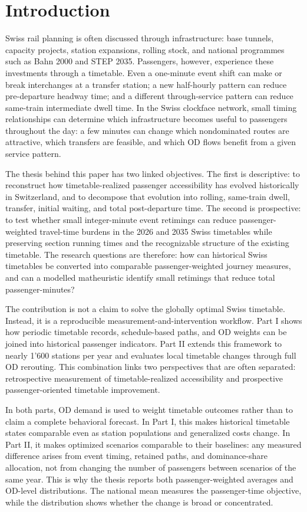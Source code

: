 \documentclass[conference]{IEEEtran}
\begin{document}
\section{Introduction}
Swiss rail planning is often discussed through infrastructure: base tunnels, capacity projects, station expansions, rolling stock, and national programmes such as Bahn 2000 and STEP 2035. Passengers, however, experience these investments through a timetable. Even a one-minute event shift can make or break interchanges at a transfer station; a new half-hourly pattern can reduce pre-departure headway time; and a different through-service pattern can reduce same-train intermediate dwell time. In the Swiss clockface network, small timing relationships can determine which infrastructure becomes useful to passengers throughout the day: a few minutes can change which nondominated routes are attractive, which transfers are feasible, and which OD flows benefit from a given service pattern.

The thesis behind this paper has two linked objectives. The first is descriptive: to reconstruct how timetable-realized passenger accessibility has evolved historically in Switzerland, and to decompose that evolution into rolling, same-train dwell, transfer, initial waiting, and total post-departure time. The second is prospective: to test whether small integer-minute event retimings can reduce passenger-weighted travel-time burdens in the 2026 and 2035 Swiss timetables while preserving section running times and the recognizable structure of the existing timetable. The research questions are therefore: how can historical Swiss timetables be converted into comparable passenger-weighted journey measures, and can a modelled matheuristic identify small retimings that reduce total passenger-minutes?

The contribution is not a claim to solve the globally optimal Swiss timetable. Instead, it is a reproducible measurement-and-intervention workflow. Part I shows how periodic timetable records, schedule-based paths, and OD weights can be joined into historical passenger indicators. Part II extends this framework to nearly 1'600 stations per year and evaluates local timetable changes through full OD rerouting. This combination links two perspectives that are often separated: retrospective measurement of timetable-realized accessibility and prospective passenger-oriented timetable improvement.

In both parts, OD demand is used to weight timetable outcomes rather than to claim a complete behavioral forecast. In Part I, this makes historical timetable states comparable even as station populations and generalized costs change. In Part II, it makes optimized scenarios comparable to their baselines: any measured difference arises from event timing, retained paths, and dominance-share allocation, not from changing the number of passengers between scenarios of the same year. This is why the thesis reports both passenger-weighted averages and OD-level distributions. The national mean measures the passenger-time objective, while the distribution shows whether the change is broad or concentrated.
\end{document}
